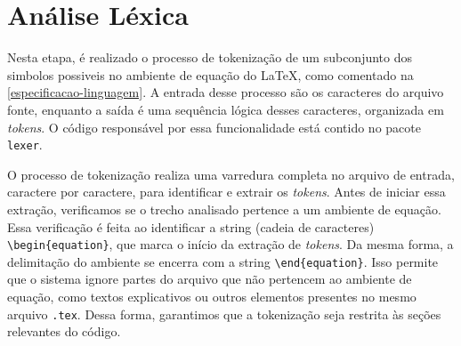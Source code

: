 %
%
%
%
%
%


\section{Análise Léxica} \label{section-lexer}

Nesta etapa, é realizado o processo de tokenização de um subconjunto dos simbolos possiveis no ambiente de equação do \LaTeX{}, como comentado na \autoref{especificacao-linguagem}. A entrada desse processo são os caracteres do arquivo fonte, enquanto a saída é uma sequência lógica desses caracteres, organizada em \textit{tokens}. O código responsável por essa funcionalidade está contido no pacote \texttt{lexer}.

O processo de tokenização realiza uma varredura completa no arquivo de entrada, caractere por caractere, para identificar e extrair os \textit{tokens}. Antes de iniciar essa extração, verificamos se o trecho analisado pertence a um ambiente de equação. Essa verificação é feita ao identificar a string (cadeia de caracteres) \verb|\begin{equation}|, que marca o início da extração de \textit{tokens}. Da mesma forma, a delimitação do ambiente se encerra com a string \verb|\end{equation}|. Isso permite que o sistema ignore partes do arquivo que não pertencem ao ambiente de equação, como textos explicativos ou outros elementos presentes no mesmo arquivo \texttt{.tex}. Dessa forma, garantimos que a tokenização seja restrita às seções relevantes do código.

